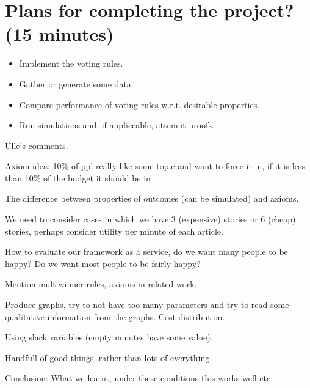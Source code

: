 \documentclass[10pt,a4paper, english]{article}
\begin{document}
\section{Plans for completing the project? (15 minutes)}
\begin{itemize}
\item Implement the voting rules.
\item Gather or generate some data.
\item Compare performance of voting rules w.r.t. desirable properties.
\item Run simulations and, if appliccable, attempt proofs.
\end{itemize}

Ulle's comments.

Axiom idea:
10\% of ppl really like some topic and want to force it in, if it is less than 10\% of the budget it should be in

The difference between properties of outcomes (can be simulated) and axioms.

We need to consider cases in which we have 3 (expensive) stories or 6 (cheap) stories, perhaps consider utility per minute of each article.

How to evaluate our framework as a service, do we want many people to be happy? Do we want most people to be fairly happy?

Mention multiwinner rules, axioms in related work.

Produce graphs, try to not have too many parameters and try to read some qualitative information from the graphs. Cost distribution.

Using slack variables (empty minutes have some value).

Handfull of good things, rather than lots of everything.

Conclusion: What we learnt, under these conditions this works well etc.
\end{document}
